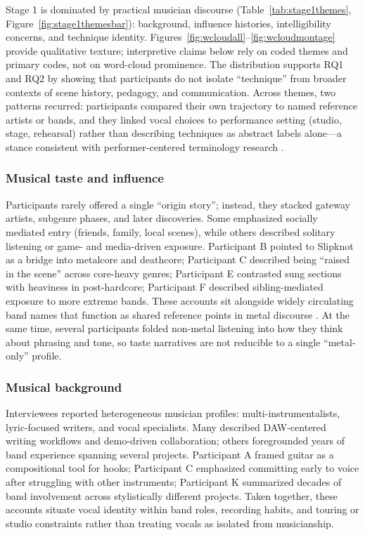 \documentclass{article}
\begin{document}
Stage 1 is dominated by practical musician discourse (Table~\ref{tab:stage1themes}, Figure~\ref{fig:stage1themesbar}): background, influence histories, intelligibility concerns, and technique identity.
Figures~\ref{fig:wcloudall}--\ref{fig:wcloudmontage} provide qualitative texture; interpretive claims below rely on coded themes and primary codes, not on word-cloud prominence.
The distribution supports RQ1 and RQ2 by showing that participants do not isolate ``technique'' from broader contexts of scene history, pedagogy, and communication.
Across themes, two patterns recurred: participants compared their own trajectory to named reference artists or bands, and they linked vocal choices to performance setting (studio, stage, rehearsal) rather than describing techniques as abstract labels alone---a stance consistent with performer-centered terminology research \parencite{Ribaldini2019Terminology,sadolin2012effects}.

\subsubsection{Musical taste and influence}
Participants rarely offered a single ``origin story''; instead, they stacked gateway artists, subgenre phases, and later discoveries.
Some emphasized socially mediated entry (friends, family, local scenes), while others described solitary listening or game- and media-driven exposure.
Participant B pointed to Slipknot as a bridge into metalcore and deathcore; Participant C described being ``raised in the scene'' across core-heavy genres; Participant E contrasted sung sections with heaviness in post-hardcore; Participant F described sibling-mediated exposure to more extreme bands.
These accounts sit alongside widely circulating band names that function as shared reference points in metal discourse \parencite{Herbst2017VoiceOfAnarchy,Ribaldini2019Terminology}.
At the same time, several participants folded non-metal listening into how they think about phrasing and tone, so taste narratives are not reducible to a single ``metal-only'' profile.

\subsubsection{Musical background}
Interviewees reported heterogeneous musician profiles: multi-instrumentalists, lyric-focused writers, and vocal specialists.
Many described DAW-centered writing workflows and demo-driven collaboration; others foregrounded years of band experience spanning several projects.
Participant A framed guitar as a compositional tool for hooks; Participant C emphasized committing early to voice after struggling with other instruments; Participant K summarized decades of band involvement across stylistically different projects.
Taken together, these accounts situate vocal identity within band roles, recording habits, and touring or studio constraints rather than treating vocals as isolated from musicianship.
\end{document}

